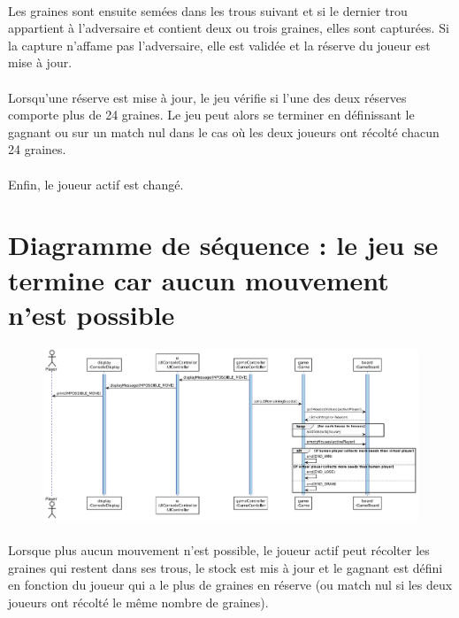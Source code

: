 \documentclass{article}
\begin{document}
    \paragraph{}
    Les graines sont ensuite semées dans les trous suivant et si le dernier trou appartient à l'adversaire et contient deux ou trois graines, elles sont capturées. Si la capture n'affame pas l'adversaire, elle est validée et la réserve du joueur est mise à jour.

    \paragraph{}
    Lorsqu'une réserve est mise à jour, le jeu vérifie si l'une des deux réserves comporte plus de 24 graines. Le jeu peut alors se terminer en définissant le gagnant ou sur un match nul dans le cas où les deux joueurs ont récolté chacun 24 graines.

    \paragraph{}
    Enfin, le joueur actif est changé.


    \newpage
    \section{Diagramme de séquence : le jeu se termine car aucun mouvement n'est possible}

    \begin{figure}[H]
        \centering
        \includegraphics[width=\linewidth]{./schemas/sequence5-end-impossible-move.png}
    \end{figure}

    \paragraph{}
    Lorsque plus aucun mouvement n'est possible, le joueur actif peut récolter les graines qui restent dans ses trous, le stock est mis à jour et le gagnant est défini en fonction du joueur qui a le plus de graines en réserve (ou match nul si les deux joueurs ont récolté le même nombre de graines).
\end{document}
